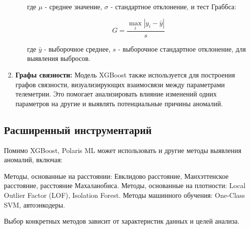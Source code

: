 \documentclass[12pt, a4paper]{extreport}
\begin{document}
\begin{enumerate}[label=\arabic*.]
\begin{enumerate}[label=\alph*.]
                    где $\mu$ - среднее значение, $\sigma$ - стандартное отклонение, и тест Граббса:

                    $$G = \frac{\max_{i}|y_i - \bar{y}|}{s}$$

                    где $\bar{y}$ - выборочное среднее, $s$ - выборочное стандартное отклонение, для выявления выбросов.
          \end{enumerate}
    \item \textbf{Графы связности:} Модель XGBoost также используется для построения графов связности, визуализирующих взаимосвязи между параметрами телеметрии. Это помогает анализировать влияние изменений одних параметров на другие и выявлять потенциальные причины аномалий.
\end{enumerate}

\subsection{Расширенный инструментарий}

Помимо XGBoost, Polaris ML может использовать и другие методы выявления аномалий, включая:

Методы, основанные на расстоянии: Евклидово расстояние, Манхэттенское расстояние, расстояние Махаланобиса.
Методы, основанные на плотности: Local Outlier Factor (LOF), Isolation Forest.
Методы машинного обучения: One-Class SVM, автоэнкодеры.

Выбор конкретных методов зависит от характеристик данных и целей анализа.

\newpage
\end{document}
